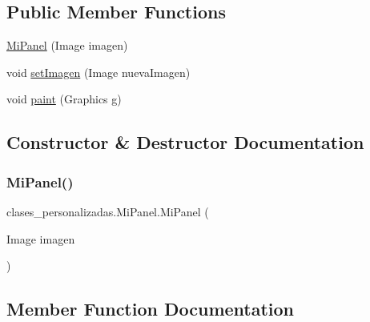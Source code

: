 \subsection*{Public Member Functions}
\begin{DoxyCompactItemize}
\item 
\mbox{\hyperlink{classclases__personalizadas_1_1_mi_panel_a8b631cdef140ef42a41b58516ddbbe75}{Mi\+Panel}} (Image imagen)
\item 
void \mbox{\hyperlink{classclases__personalizadas_1_1_mi_panel_a18e1a3b7afb5e0eee1eb7439e199f8f5}{set\+Imagen}} (Image nueva\+Imagen)
\item 
void \mbox{\hyperlink{classclases__personalizadas_1_1_mi_panel_accd50761dc84e9381db7166a8d4cfb06}{paint}} (Graphics g)
\end{DoxyCompactItemize}


\subsection{Constructor \& Destructor Documentation}
\mbox{\label{classclases__personalizadas_1_1_mi_panel_a8b631cdef140ef42a41b58516ddbbe75}} 
\subsubsection{\texorpdfstring{Mi\+Panel()}{MiPanel()}}
{\footnotesize\ttfamily clases\+\_\+personalizadas.\+Mi\+Panel.\+Mi\+Panel (\begin{DoxyParamCaption}\item[{Image}]{imagen }\end{DoxyParamCaption})}



\subsection{Member Function Documentation}
\mbox{\label{classclases__personalizadas_1_1_mi_panel_accd50761dc84e9381db7166a8d4cfb06}} 

